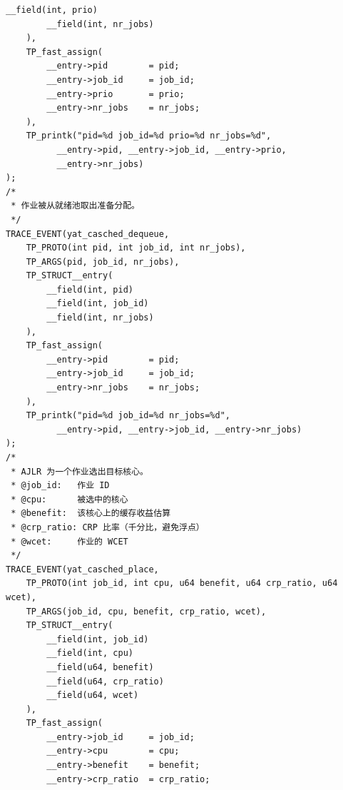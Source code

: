 \documentclass[10pt,a4paper]{article}
\newenvironment{yatpage}{\vspace*{0pt}}{\par}
\begin{document}
\newpage
\begin{yatpage}
\begin{Verbatim}[fontsize=\fontsize{8.2}{9.8}\selectfont]
		__field(int, prio)
		__field(int, nr_jobs)
	),
	TP_fast_assign(
		__entry->pid		= pid;
		__entry->job_id		= job_id;
		__entry->prio		= prio;
		__entry->nr_jobs	= nr_jobs;
	),
	TP_printk("pid=%d job_id=%d prio=%d nr_jobs=%d",
		  __entry->pid, __entry->job_id, __entry->prio,
		  __entry->nr_jobs)
);
/*
 * 作业被从就绪池取出准备分配。
 */
TRACE_EVENT(yat_casched_dequeue,
	TP_PROTO(int pid, int job_id, int nr_jobs),
	TP_ARGS(pid, job_id, nr_jobs),
	TP_STRUCT__entry(
		__field(int, pid)
		__field(int, job_id)
		__field(int, nr_jobs)
	),
	TP_fast_assign(
		__entry->pid		= pid;
		__entry->job_id		= job_id;
		__entry->nr_jobs	= nr_jobs;
	),
	TP_printk("pid=%d job_id=%d nr_jobs=%d",
		  __entry->pid, __entry->job_id, __entry->nr_jobs)
);
/*
 * AJLR 为一个作业选出目标核心。
 * @job_id:   作业 ID
 * @cpu:      被选中的核心
 * @benefit:  该核心上的缓存收益估算
 * @crp_ratio: CRP 比率（千分比，避免浮点）
 * @wcet:     作业的 WCET
 */
TRACE_EVENT(yat_casched_place,
	TP_PROTO(int job_id, int cpu, u64 benefit, u64 crp_ratio, u64 wcet),
	TP_ARGS(job_id, cpu, benefit, crp_ratio, wcet),
	TP_STRUCT__entry(
		__field(int, job_id)
		__field(int, cpu)
		__field(u64, benefit)
		__field(u64, crp_ratio)
		__field(u64, wcet)
	),
	TP_fast_assign(
		__entry->job_id		= job_id;
		__entry->cpu		= cpu;
		__entry->benefit	= benefit;
		__entry->crp_ratio	= crp_ratio;
\end{Verbatim}
\end{yatpage}
\newpage
\end{document}
